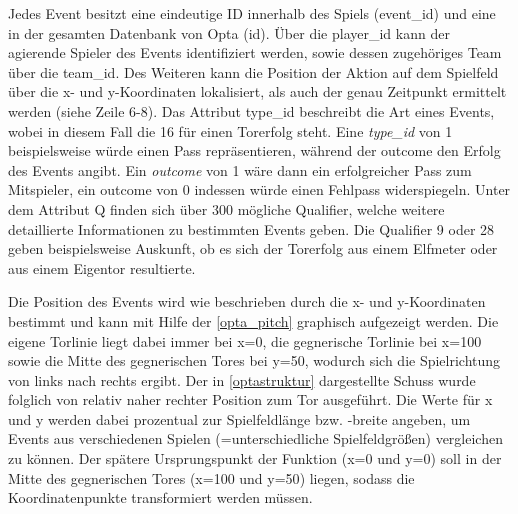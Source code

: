 Jedes Event besitzt eine eindeutige ID innerhalb des Spiels (\textsf{\glqq event\_id\grqq}) und eine in der gesamten Datenbank von Opta (\textsf{\glqq id\grqq}). Über die \textsf{\glqq player\_id\grqq} kann der agierende Spieler des Events identifiziert werden, sowie dessen zugehöriges Team über die \textsf{\glqq team\_id\grqq}. Des Weiteren kann die Position der Aktion auf dem Spielfeld über die \textsf{\glqq x\grqq}- und \textsf{\glqq y\grqq}-Koordinaten lokalisiert, als auch der genau Zeitpunkt ermittelt werden (siehe Zeile 6-8). Das Attribut \textsf{\glqq type\_id\grqq} beschreibt die Art eines Events, wobei in diesem Fall die \textsf{16} für einen Torerfolg steht. Eine \textit{\glqq type\_id\grqq} von \textsf{1} beispielsweise würde einen Pass repräsentieren, während der \textsf{\glqq outcome\grqq} den Erfolg des Events angibt. Ein \textit{\glqq outcome\grqq} von \textsf{1} wäre dann ein erfolgreicher Pass zum Mitspieler, ein \textsf{\glqq outcome\grqq} von \textsf{0} indessen würde einen Fehlpass widerspiegeln. Unter dem Attribut \textsf{\glqq Q\grqq} finden sich über 300 mögliche Qualifier, welche weitere detaillierte Informationen zu bestimmten Events geben. Die Qualifier \textsf{9} oder \textsf{28} geben beispielsweise Auskunft, ob es sich der Torerfolg aus einem Elfmeter oder aus einem Eigentor resultierte.

Die Position des Events wird wie beschrieben durch die \textsf{\glqq x\grqq}- und \textsf{\glqq y\grqq}-Koordinaten bestimmt und kann mit Hilfe der \vref{opta_pitch} graphisch aufgezeigt werden. Die eigene Torlinie liegt dabei immer bei \textsf{x=0}, die gegnerische Torlinie bei \textsf{x=100} sowie die Mitte des gegnerischen Tores bei \textsf{y=50}, wodurch sich die Spielrichtung von links nach rechts ergibt. Der in \vref{optastruktur} dargestellte Schuss wurde folglich von relativ naher rechter Position zum Tor ausgeführt. Die Werte für x und y werden dabei prozentual zur Spielfeldlänge bzw. -breite angeben, um Events aus verschiedenen Spielen (=unterschiedliche Spielfeldgrößen) vergleichen zu können. Der spätere Ursprungspunkt der Funktion (\textsf{x=0} und \textsf{y=0}) soll in der Mitte des gegnerischen Tores (\textsf{x=100} und \textsf{y=50}) liegen, sodass die Koordinatenpunkte transformiert werden müssen.


